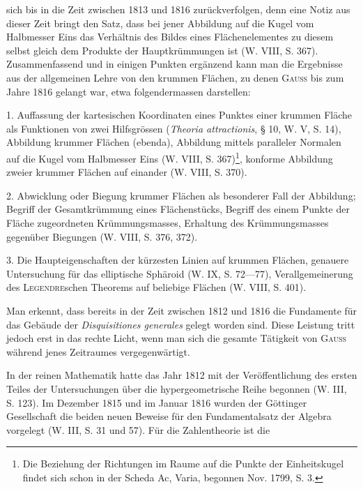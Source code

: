 sich bis in die Zeit zwischen 1813 und 1816 zurückverfolgen, denn eine Notiz
aus dieser Zeit bringt den Satz, dass bei jener Abbildung auf die Kugel vom
Halbmesser Eins das Verhältnis des Bildes eines Flächenelementes zu diesem
selbst gleich dem Produkte der Hauptkrümmungen ist (W. VIII, S. 367).
\clearpage{}\setcounter{footnote}{0}
\noindent\hspace*{\parindent}Zusammenfassend und in einigen Punkten ergänzend kann man die Ergebnisse
aus der allgemeinen Lehre von den krummen Flächen, zu denen \textsc{Gauss}
bis zum Jahre 1816 gelangt war, etwa folgendermassen darstellen:
\par
1. Auffassung der kartesischen Koordinaten eines Punktes einer krummen
Fläche als Funktionen von zwei Hilfsgrössen (\textit{Theoria attractionis}, § 10, W. V,
S. 14), Abbildung krummer Flächen (ebenda), Abbildung mittels paralleler Normalen
auf die Kugel vom Halbmesser Eins (W. VIII, S. 367)\footnote{Die Beziehung der Richtungen im Raume auf die Punkte der Einheitskugel findet sich schon in der Scheda Ac, Varia, begonnen Nov. 1799, S. 3.}, konforme Abbildung
zweier krummer Flächen auf einander (W. VIII, S. 370).
\par
2. Abwicklung oder Biegung krummer Flächen als besonderer Fall der
Abbildung; Begriff der Gesamtkrümmung eines Flächenstücks, Begriff des
einem Punkte der Fläche zugeordneten Krümmungsmasses, Erhaltung des
Krümmungsmasses gegenüber Biegungen (W. VIII, S. 376, 372).
\par
3. Die Haupteigenschaften der kürzesten Linien auf krummen Flächen,
genauere Untersuchung für das elliptische Sphäroid (W. IX, S. 72—77), Verallgemeinerung
des \textsc{Legendre}schen Theorems auf beliebige Flächen (W. VIII,
S. 401).
\par
Man erkennt, dass bereits in der Zeit zwischen 1812 und 1816 die Fundamente
für das Gebäude der \textit{Disquisitiones generales} gelegt worden sind. Diese
Leistung tritt jedoch erst in das rechte Licht, wenn man sich die gesamte
Tätigkeit von \textsc{Gauss} während jenes Zeitraumes vergegenwärtigt.
\par
In der reinen Mathematik hatte das Jahr 1812 mit der Veröffentlichung
des ersten Teiles der Untersuchungen über die hypergeometrische Reihe begonnen
(W. III, S. 123). Im Dezember 1815 und im Januar 1816 wurden
der Göttinger Gesellschaft die beiden neuen Beweise für den Fundamentalsatz
der Algebra vorgelegt (W. III, S. 31 und 57). Für die Zahlentheorie ist die

